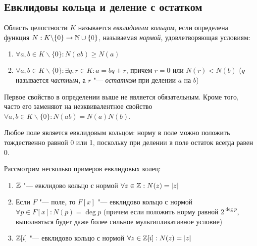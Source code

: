 \subsection{Евклидовы кольца и деление с остатком	}

\begin{definition}
	Область целостности $K$ называется \textit{евклидовым кольцом}, если определена функция $N: K\backslash\{0\} \to \mathbb{N} \cup \{0\}$, называемая \textit{нормой}, удовлетворяющая условиям:
	\begin{enumerate}
		\item $\forall a, b \in K\backslash\{0\}: N(ab) \ge N(a)$
		\item $\forall a, b \in K\backslash\{0\}: \exists q, r \in K: a = bq + r$, причем $r = 0$ или $N(r) < N(b)$ ($q$ называется \textit{частным}, а $r$ "--- \textit{остатком} при делении $a$ на $b$)
	\end{enumerate}
\end{definition}

\begin{note}
	Первое свойство в определении выше не является обязательным. Кроме того, часто его заменяют на неэквивалентное свойство $\forall a, b \in K \backslash \{0\}: N(ab) = N(a)N(b)$.
\end{note}

\begin{note}
	Любое поле является евклидовым кольцом: норму в поле можно положить тождественно равной 0 или 1, поскольку при делении в поле остаток всегда равен $0$.
\end{note}

\begin{example}
	Рассмотрим несколько примеров евклидовых колец:
	\begin{enumerate}
		\item $\mathbb{Z}$ "--- евклидово кольцо с нормой $\forall z \in \mathbb{Z}: N(z) = |z|$
		\item Если $F$ "--- поле, то $F[x]$ "--- евклидово кольцо с нормой $\forall p \in F[x]: N(p) = \deg{p}$ (причем если положить норму равной $2^{\deg{p}}$, выполняться будет даже более сильное мультипликативное условие)
		\item $\mathbb{Z}[i]$ "--- евклидово кольцо с нормой $\forall z \in \mathbb{Z}[i]: N(z) = |z|$
	\end{enumerate}
\end{example}